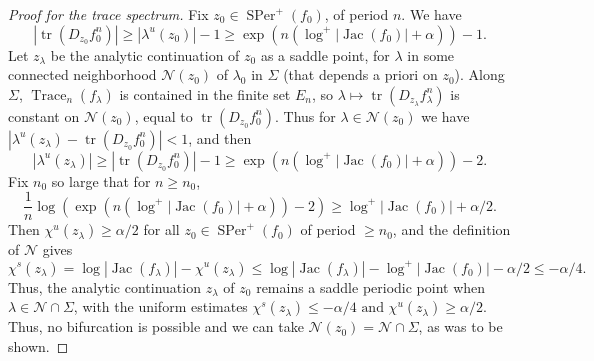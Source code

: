 \documentclass[oneside, 12pt]{amsart}
\newcommand{\abs}[1]{\left\vert#1\right\vert}
\newcommand{\unsur}[1]{\frac{1}{#1}}
\newcommand{\lrpar}[1]{\left(#1\right)}
\DeclareMathOperator{\tr}{tr}
\DeclareMathOperator{\jac}{Jac}
\DeclareMathOperator{\SPer}{SPer}
\DeclareMathOperator{\Trace}{Trace}
\theoremstyle{plain}
\theoremstyle{definition}
\numberwithin{equation}{section}       %
\numberwithin{equation}{section}       %
\begin{document}
\begin{proof}[Proof for the trace spectrum]
Fix $z_0\in \SPer^+(f_0)$, of period $n$. We have 
 \begin{equation}
\abs{\tr(D_{z_0}f_0^n)} \geq \abs{\lambda^u(z_0)}- 1 \geq \exp\lrpar{n(\log^+\abs{\jac(f_0)}+\alpha)}-1. \end{equation}
Let  $z_\lambda$ be the analytic continuation of $z_0$ as a saddle point, for $\lambda$ in some connected 
neighborhood $\mathcal N(z_0)$ of $\lambda_0$ in $\Sigma$ (that  depends a priori on $z_0$). 
Along $\Sigma$, 
$\Trace_n(f_\lambda)$ is contained in the finite set $E_n$, so 
 $\lambda \mapsto \tr(D_{z_\lambda}f_\lambda^n)$ is constant on
 $\mathcal{N}(z_0)$, equal to $\tr(D_{z_0}f_0^n)$. Thus for $\lambda\in \mathcal N(z_0)$ we have $\abs{\lambda^u(z_\lambda) - \tr(D_{z_0}f_0^n)}<1$, and then
\begin{equation}\abs{\lambda^u(z_\lambda)}\geq \abs{\tr(D_{z_0}f_0^n)} -1 \geq 
\exp\lrpar{n(\log^+\abs{\jac(f_0)}+\alpha)}-2.\end{equation} 
Fix  $n_0$ so large  that for   $n\geq n_0$,
\begin{equation} \label{eq:apriorichiu}
\unsur{n}\log \lrpar{\exp\lrpar{n(\log^+\abs{\jac(f_0)}+\alpha)}-2}\geq\log^+\abs{\jac(f_0)} + \alpha/2.
\end{equation} 
Then $ \chi^u(z_\lambda)\geq   \alpha/2$ for all $z_0\in \SPer^+(f_0)$ of period $\geq n_0$, and  the definition of $\mathcal N$ gives
\begin{equation}
\chi^s(z_\lambda)  = \log \abs{\jac(f_\lambda)}  - \chi^u(z_\lambda)\leq 
 \log \abs{\jac(f_\lambda)}   - \log^+\abs{\jac(f_0)} - \alpha/2  \leq - \alpha/4. 
\end{equation}
Thus, the analytic continuation $z_\lambda$ of $z_0$ remains a saddle periodic point when 
 $\lambda\in \mathcal N \cap  \Sigma$, with the uniform estimates
$  \chi^s(z_\lambda) \leq  -\alpha/4 \text{ and } \chi^u(z_\lambda)\geq   \alpha/2. $ 
Thus, no bifurcation is possible and we can take  $ \mathcal N(z_0)= \mathcal N\cap \Sigma$, as was to be shown.


\end{proof}
\end{document}
